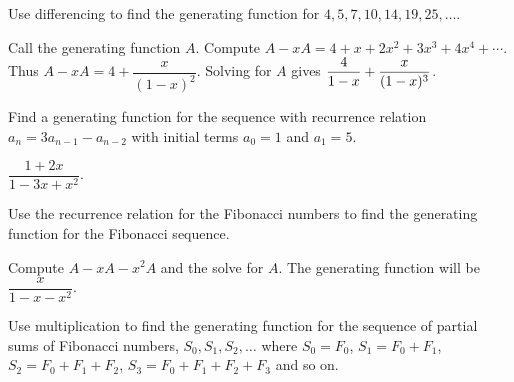 \begin{questions}
\begin{answer}
	\end{answer}






\question Use differencing to find the generating function for $4, 5, 7, 10, 14, 19, 25, \ldots$.

	\begin{answer}
		Call the generating function $A$.  Compute $A - xA = 4 + x + 2x^2 + 3x^3 + 4x^4 + \cdots$.  Thus $A - xA = 4 + \dfrac{x}{(1-x)^2}$.  Solving for $A$ gives $\displaystyle\frac{4}{1-x} + \frac{x}{(1-x)^3}$.  %
	\end{answer}






\question Find a generating function for the sequence with recurrence relation $a_n = 3a_{n-1} - a_{n-2}$ with initial terms $a_0 = 1$ and $a_1 = 5$.

	\begin{answer}
		$\dfrac{1+2x}{1-3x + x^2}$.  %
	\end{answer}






\question Use the recurrence relation for the Fibonacci numbers to find the generating function for the Fibonacci sequence.

	\begin{answer}
		Compute $A - xA - x^2A$ and the solve for $A$.  The generating function will be $\dfrac{x}{1-x-x^2}$.  %
	\end{answer}






\question Use multiplication to find the generating function for the sequence of partial sums of Fibonacci numbers, $S_0, S_1, S_2, \ldots$ where $S_0 = F_0$, $S_1 = F_0 + F_1$, $S_2 = F_0 + F_1 + F_2$, $S_3 = F_0 + F_1 + F_2 + F_3$ and so on.


\end{questions}
